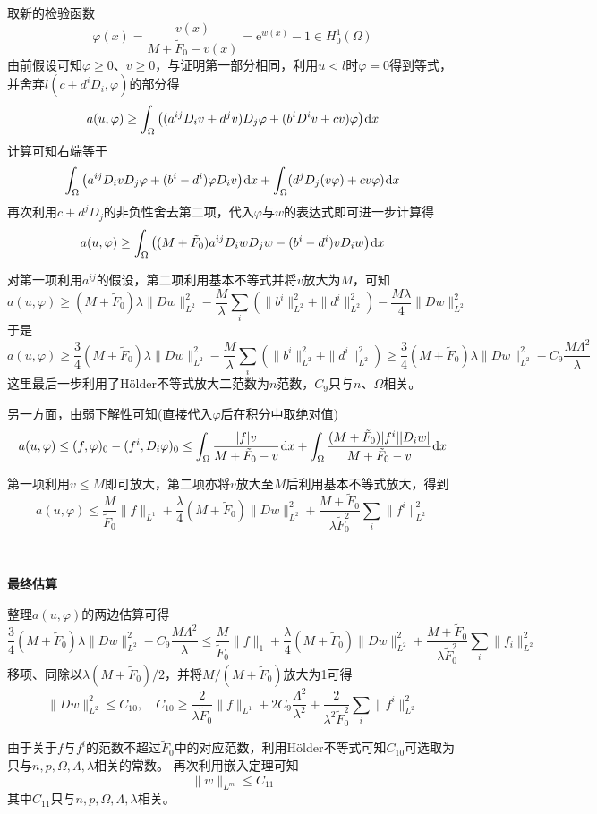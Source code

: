 \documentclass[a4paper,UTF8,fontset=windows,AutoFakeBold]{ctexart}
\newcommand*{\er}{\mathrm{e}}
\newcommand*{\dr}{\hspace{0.07em}\mathrm{d}}
\begin{document}
{    取新的检验函数
    $$\varphi(x)=\frac{v(x)}{M+\tilde{F}_0-v(x)}=\er^{w(x)}-1\in H_0^1(\Omega)$$
    由前假设可知$\varphi\ge0$、$v\ge0$，与证明第一部分相同，利用$u<l$时$\varphi=0$得到等式，并舍弃$l(c+d^iD_i,\varphi)$的部分得
    $$a(u,\varphi)\ge\int_\Omega\big((a^{ij}D_iv+d^jv)D_j\varphi+(b^iD^iv+cv)\varphi\big)\dr x$$
    计算可知右端等于
    $$\int_\Omega\big(a^{ij}D_ivD_j\varphi+(b^i-d^i)\varphi D_iv\big)\dr x+\int_\Omega(d^jD_j(v\varphi)+cv\varphi)\dr x$$
    再次利用$c+d^jD_j$的非负性舍去第二项，代入$\varphi$与$w$的表达式即可进一步计算得
    $$a(u,\varphi)\ge\int_\Omega\big((M+\tilde{F}_0)a^{ij}D_iwD_jw-(b^i-d^i)vD_iw\big)\dr x$$

    对第一项利用$a^{ij}$的假设，第二项利用基本不等式并将$v$放大为$M$，可知
    $$a(u,\varphi)\ge(M+\tilde{F}_0)\lambda\|Dw\|_{L^2}^2-\frac{M}{\lambda}\sum_i(\|b^i\|_{L^2}^2+\|d^i\|_{L^2}^2)-\frac{M\lambda}{4}\|Dw\|_{L^2}^2$$
    于是
    $$a(u,\varphi)\ge\frac{3}{4}(M+\tilde{F}_0)\lambda\|Dw\|_{L^2}^2-\frac{M}{\lambda}\sum_i(\|b^i\|_{L^2}^2+\|d^i\|_{L^2}^2)\ge\frac{3}{4}(M+\tilde{F}_0)\lambda\|Dw\|_{L^2}^2-C_9\frac{M\Lambda^2}{\lambda}$$
    这里最后一步利用了H\"older不等式放大二范数为$n$范数，$C_9$只与$n$、$\Omega$相关。

    另一方面，由弱下解性可知(直接代入$\varphi$后在积分中取绝对值)
    $$a(u,\varphi)\le(f,\varphi)_0-(f^i,D_i\varphi)_0\le\int_\Omega\frac{|f|v}{M+\tilde{F}_0-v}\dr x+\int_\Omega\frac{(M+\tilde{F}_0)|f^i||D_iw|}{M+\tilde{F}_0-v}\dr x$$

    第一项利用$v\le M$即可放大，第二项亦将$v$放大至$M$后利用基本不等式放大，得到
    $$a(u,\varphi)\le\frac{M}{\tilde{F}_0}\|f\|_{L^1}+\frac{\lambda}{4}(M+\tilde{F}_0)\|Dw\|_{L^2}^2+\frac{M+\tilde{F}_0}{\lambda\tilde{F}_0^2}\sum_i\|f^i\|_{L^2}^2$$

    \

    \textbf{最终估算}

    整理$a(u,\varphi)$的两边估算可得
    $$\frac{3}{4}(M+\tilde{F}_0)\lambda\|Dw\|_{L^2}^2-C_9\frac{M\Lambda^2}{\lambda}\le\frac{M}{\tilde{F}_0}\|f\|_1+\frac{\lambda}{4}(M+\tilde{F}_0)\|Dw\|_{L^2}^2+\frac{M+\tilde{F}_0}{\lambda\tilde{F}_0^2}\sum_i\|f_i\|_{L^2}^2$$
    移项、同除以$\lambda(M+\tilde{F}_0)/2$，并将$M/(M+\tilde{F}_0)$放大为1可得
    $$\|Dw\|_{L^2}^2\le C_{10},\quad C_{10}\ge\frac{2}{\lambda\tilde{F}_0}\|f\|_{L^1}+2C_9\frac{\Lambda^2}{\lambda^2}+\frac{2}{\lambda^2\tilde{F}_0^2}\sum_i\|f^i\|_{L^2}^2$$

    由于关于$f$与$f^i$的范数不超过$\tilde{F}_0$中的对应范数，利用H\"older不等式可知$C_{10}$可选取为只与$n,p,\Omega,\Lambda,\lambda$相关的常数。
    再次利用嵌入定理可知
    $$\|w\|_{L^m}\le C_{11}$$
    其中$C_{11}$只与$n,p,\Omega,\Lambda,\lambda$相关。

}
\end{document}
